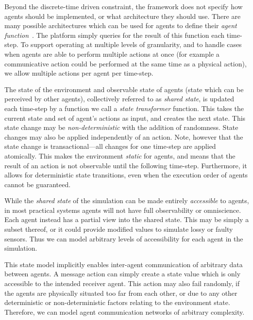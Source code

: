 Beyond the discrete-time driven constraint, the framework does not specify how
agents should be implemented, or what architecture they should use. There are
many possible architectures which can be used for agents to define their
\emph{agent function}~\citep{Rao1995,Kakas:2004bh}. The platform simply
queries for the result of this function each time-step. To support operating
at multiple levels of granularity, and to handle cases when agents are able to
perform multiple actions at once (for example a communicative action could be
performed at the same time as a physical action), we allow multiple actions
per agent per time-step.

The state of the environment and observable state of agents (\ie state which
can be perceived by other agents), collectively referred to as \emph{shared
state}, is updated each time-step by a function we call a \emph{state
transformer} function. This takes the current state and set of agent's
actions as input, and creates the next state. This state change may be 
\emph{non-deterministic} with the addition of randomness. State changes may 
also be applied independently of an action. Note, however that the state change 
is transactional---all changes for one time-step are applied atomically. This
makes the environment \emph{static} for agents, and means that the result of
an action is not observable until the following time-step. Furthermore, it allows 
for deterministic state transitions, even when the execution order of agents 
cannot be guaranteed.

While the \emph{shared state} of the simulation can be made entirely
\emph{accessible} to agents, in most practical systems agents will not have
full observability or omniscience. Each agent instead has a partial view into
the shared state. This may be simply a subset thereof, or it could provide
modified values to simulate lossy or faulty sensors. Thus we can model
arbitrary levels of accessibility for each agent in the simulation.

This state model implicitly enables inter-agent communication of arbitrary
data between agents. A message action can simply create a state value which is
only accessible to the intended receiver agent. This action may also fail
randomly, if the agents are physically situated too far from each other, or due
to any other deterministic or non-deterministic factors relating to the environment
state. Therefore, we can model agent communication networks of arbitrary
complexity.


